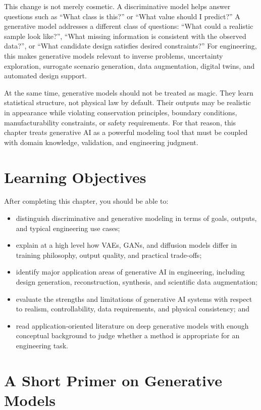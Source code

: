 \documentclass[12pt]{article}
\begin{document}
This change is not merely cosmetic. A discriminative model helps answer questions such as ``What class is this?'' or ``What value should I predict?'' A generative model addresses a different class of questions: ``What could a realistic sample look like?'', ``What missing information is consistent with the observed data?'', or ``What candidate design satisfies desired constraints?'' For engineering, this makes generative models relevant to inverse problems, uncertainty exploration, surrogate scenario generation, data augmentation, digital twins, and automated design support.

At the same time, generative models should not be treated as magic. They learn statistical structure, not physical law by default. Their outputs may be realistic in appearance while violating conservation principles, boundary conditions, manufacturability constraints, or safety requirements. For that reason, this chapter treats generative AI as a powerful modeling tool that must be coupled with domain knowledge, validation, and engineering judgment.

\section*{Learning Objectives}
After completing this chapter, you should be able to:
\begin{itemize}
    \item distinguish discriminative and generative modeling in terms of goals, outputs, and typical engineering use cases;
    \item explain at a high level how VAEs, GANs, and diffusion models differ in training philosophy, output quality, and practical trade-offs;
    \item identify major application areas of generative AI in engineering, including design generation, reconstruction, synthesis, and scientific data augmentation;
    \item evaluate the strengths and limitations of generative AI systems with respect to realism, controllability, data requirements, and physical consistency; and
    \item read application-oriented literature on deep generative models with enough conceptual background to judge whether a method is appropriate for an engineering task.
\end{itemize}

\section{A Short Primer on Generative Models}
\end{document}
